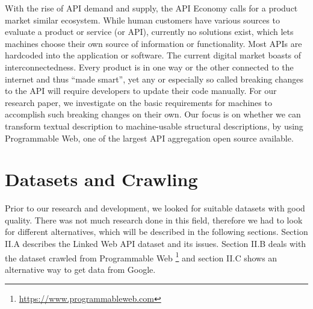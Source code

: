 \documentclass[a4paper]{IEEEtran}
\begin{document}
With the rise of API demand and supply, the API Economy calls for a product market similar ecosystem. While human customers have various sources to evaluate a product or service (or API), currently no solutions exist, which lets machines choose their own source of information or functionality. Most APIs are hardcoded into the application or software. The current digital market boasts of interconnectedness. Every product is in one way or the other connected to the internet and thus “made smart”, yet any or especially so called breaking changes to the API will require developers to update their code manually. 
For our research paper, we investigate on the basic requirements for machines to accomplish such breaking changes on their own. Our focus is on whether we can transform textual description to machine-usable structural descriptions, by using Programmable Web, one of the largest API aggregation open source available.

\section{Datasets and Crawling}
Prior to our research and development, we looked for suitable datasets with good quality. There was not much research done in this field, therefore we had to look for different alternatives, which will be described in the following sections. Section II.A describes the Linked Web API dataset and its issues. Section II.B deals with the dataset crawled from Programmable Web  \footnote[1]{\url{https://www.programmableweb.com}} and section II.C shows an alternative way to get data from Google.
\end{document}
